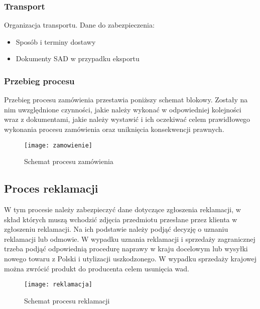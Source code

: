 			\subsubsection{Transport}
				Organizacja transportu. Dane do zabezpieczenia:
				\begin{itemize}
					\item Sposób i terminy dostawy
					\item Dokumenty SAD w przypadku eksportu
				\end{itemize}
			
			\subsubsection{Przebieg procesu}
				\par Przebieg procesu zamówienia przestawia poniższy schemat blokowy. Zostały na nim uwzględnione czynności, jakie należy wykonać w odpowiedniej kolejności wraz z dokumentami, jakie należy wystawić i ich oczekiwać celem prawidłowego wykonania procesu zamówienia oraz uniknięcia konsekwencji prawnych.
			
				\begin{figure}[H]
					\centering
					\texttt{[image: zamowienie]}
					\caption{Schemat procesu zamówienia}
				\end{figure}
			
		\subsection{Proces reklamacji}
			\par W tym procesie należy zabezpieczyć dane dotyczące zgłoszenia reklamacji, w skład których muszą wchodzić zdjęcia przedmiotu przesłane przez klienta w zgłoszeniu reklamacji. Na ich podstawie należy podjąć decyzję o uznaniu reklamacji lub odmowie. W wypadku uznania reklamacji i sprzedaży zagranicznej trzeba podjąć odpowiednią procedurę naprawy w kraju docelowym lub wysyłki nowego towaru z Polski i utylizacji uszkodzonego. W wypadku sprzedaży krajowej można zwrócić produkt do producenta celem usunięcia wad.
			
			
			\begin{figure}[H]
				\centering
				\texttt{[image: reklamacja]}
				\caption{Schemat procesu reklamacji}
			\end{figure}
			
